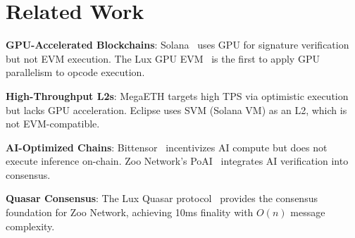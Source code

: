 \section{Related Work}


\textbf{GPU-Accelerated Blockchains}: Solana~\cite{yakovenko2018solana} uses GPU for signature verification but not EVM execution. The Lux GPU EVM~\cite{lux-evmgpu-benchmark} is the first to apply GPU parallelism to opcode execution.

\textbf{High-Throughput L2s}: MegaETH targets high TPS via optimistic execution but lacks GPU acceleration. Eclipse uses SVM (Solana VM) as an L2, which is not EVM-compatible.

\textbf{AI-Optimized Chains}: Bittensor~\cite{bittensor2023} incentivizes AI compute but does not execute inference on-chain. Zoo Network's PoAI~\cite{zoo-poai-consensus} integrates AI verification into consensus.

\textbf{Quasar Consensus}: The Lux Quasar protocol~\cite{lux-quasar-consensus,lux-quasar-benchmarks} provides the consensus foundation for Zoo Network, achieving 10ms finality with $O(n)$ message complexity.

